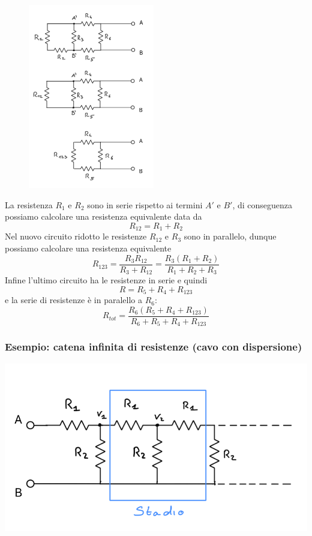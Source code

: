 \begin{figure}

  \centering
  \includegraphics[width=0.49\textwidth]{images/redux1}
\end{figure}
La resistenza $R_{1}$ e $R_{2}$ sono in serie rispetto ai termini $A'$ e $B'$, di conseguenza possiamo calcolare una resistenza equivalente data da 
\begin{equation*}
	R_{12} = R_{1} + R_{2}
\end{equation*}
Nel nuovo circuito ridotto le resistenze $R_{12}$ e $R_{3}$ sono in parallelo, dunque possiamo calcolare una resistenza equivalente
\begin{equation*}
	R_{123} = \frac{R_{3}R_{12}}{R_{3}+R_{12}} = \frac{R_{3}(R_{1} + R_{2})}{R_{1} + R_{2} + R_{3}}
\end{equation*}
Infine l'ultimo circuito ha le resistenze in serie e quindi 
\begin{equation*}
	R = R_5 + R_{4} + R_{123}
\end{equation*}
e la serie di resistenze \`e in paralello a $R_6$:
\begin{equation*}
	R_{tot} = \frac{R_{6}(R_5 + R_4 + R_{123})}{R_6 + R_{5} + R_{4} + R_{123}}
\end{equation*}

\subsubsection{Esempio: catena infinita di resistenze (cavo con dispersione)}

\begin{center}
	\includegraphics[width = 8 cm]{images/stadio}
\end{center}

